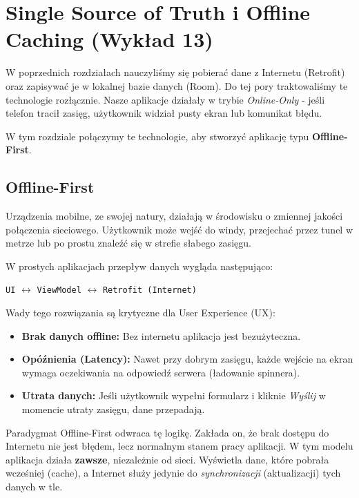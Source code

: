 \chapter{Single Source of Truth i Offline Caching (Wykład 13)}

W poprzednich rozdziałach nauczyliśmy się pobierać dane z Internetu (Retrofit) oraz zapisywać je w lokalnej bazie danych (Room). Do tej pory traktowaliśmy te technologie rozłącznie. Nasze aplikacje działały w trybie \textit{Online-Only} - jeśli telefon tracił zasięg, użytkownik widział pusty ekran lub komunikat błędu.

W tym rozdziale połączymy te technologie, aby stworzyć aplikację typu \textbf{Offline-First}.

\section{Offline-First}

Urządzenia mobilne, ze swojej natury, działają w środowisku o zmiennej jakości połączenia sieciowego. Użytkownik może wejść do windy, przejechać przez tunel w metrze lub po prostu znaleźć się w strefie słabego zasięgu.

W prostych aplikacjach przepływ danych wygląda następująco:
\begin{center}
\texttt{UI} $\leftrightarrow$ \texttt{ViewModel} $\leftrightarrow$ \texttt{Retrofit (Internet)}
\end{center}

Wady tego rozwiązania są krytyczne dla User Experience (UX):
\begin{itemize}
    \item \textbf{Brak danych offline:} Bez internetu aplikacja jest bezużyteczna.
    \item \textbf{Opóźnienia (Latency):} Nawet przy dobrym zasięgu, każde wejście na ekran wymaga oczekiwania na odpowiedź serwera (ładowanie spinnera).
    \item \textbf{Utrata danych:} Jeśli użytkownik wypełni formularz i kliknie \textit{Wyślij} w momencie utraty zasięgu, dane przepadają.
\end{itemize}

Paradygmat Offline-First odwraca tę logikę. Zakłada on, że brak dostępu do Internetu nie jest błędem, lecz normalnym stanem pracy aplikacji. W tym modelu aplikacja działa \textbf{zawsze}, niezależnie od sieci. Wyświetla dane, które pobrała wcześniej (cache), a Internet służy jedynie do \textit{synchronizacji} (aktualizacji) tych danych w tle.

